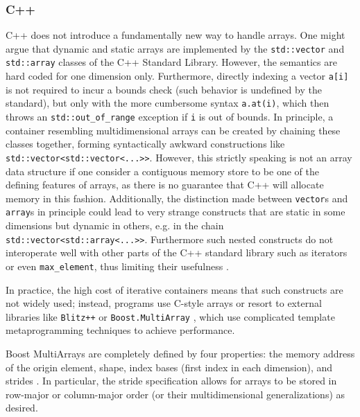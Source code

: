 \documentclass[preprint]{sigplanconf}
\newcommand{\code}[1]{\texttt{#1}}
\begin{document}

\subsubsection{C++}


C++ does not introduce a fundamentally new way to handle arrays. One might
argue that dynamic and static arrays are implemented by the \code{std::vector}
and \code{std::array} classes of the C++ Standard Library. However, the
semantics are hard coded for one dimension only. Furthermore, directly
indexing a vector \code{a[i]} is not required to incur a bounds check (such
behavior is undefined by the standard), but only with the more cumbersome
syntax \code{a.at(i)}, which then throws an \code{std::out\_of\_range}
exception if \code{i} is out of bounds. In principle, a container resembling
multidimensional arrays can be created by chaining these classes together,
forming syntactically awkward constructions like
\code{std::vector<std::vector<...>>}. However, this strictly speaking is not
an array data structure if one consider a contiguous memory store to be one of
the defining features of arrays, as there is no guarantee that C++ will
allocate memory in this fashion. Additionally, the distinction made between
\code{vector}s and \code{array}s in principle could lead to very strange
constructs that are static in some dimensions but dynamic in others, e.g. in
the chain \code{std::vector<std::array<...>>}. Furthermore such nested constructs
do not interoperate well with other parts of the C++ standard library such as
iterators or even \code{max\_element}, thus limiting their usefulness
\cite{Bavestrelli:2000ct}.

In practice, the high cost of iterative containers means that such constructs
are not widely used; instead, programs use C-style arrays or resort to
external libraries like \code{Blitz++} \cite{Veldhuizen:1998ab} or
\code{Boost.MultiArray} \cite{Garcia:2005ma}, which use complicated
template metaprogramming techniques to achieve performance.

Boost MultiArrays are completely defined by four properties: the memory
address of the origin element, shape, index bases (first index in each
dimension), and strides \cite{Garcia:2005ma}. In particular, the stride
specification allows for arrays to be stored in row-major or column-major
order (or their multidimensional generalizations) as desired.
\end{document}

